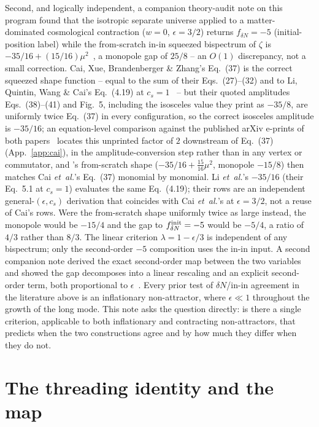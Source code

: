 \documentclass[aps,prd,twocolumn,superscriptaddress,showpacs,preprintnumbers,nofootinbib,longbibliography,floatfix]{revtex4-2}
\newcommand{\eps}{\epsilon}
\newcommand{\etal}{\textit{et~al.}}
\begin{document}
Second, and logically independent, a companion theory-audit note on this program found
that the isotropic separate universe applied to a matter-dominated cosmological
contraction ($w=0$, $\eps=3/2$) returns $f_{\delta N}=-5$ (initial-position label) while
the from-scratch in-in squeezed bispectrum of $\zeta$ is
$-35/16+(15/16)\mu^2$~\cite{Golden2026Monopole}, a monopole gap of $25/8$ -- an $O(1)$
discrepancy, not a small correction. Cai, Xue, Brandenberger \& Zhang's Eq.~(37) is the correct squeezed shape function --
equal to the sum of their Eqs.~(27)--(32) and to Li, Quintin, Wang \& Cai's Eq.~(4.19) at
$c_s=1$~\cite{Cai2009,LiQuintinWangCai2017} -- but their quoted amplitudes Eqs.~(38)--(41)
and Fig.~5, including the isosceles value they print as $-35/8$, are uniformly twice
Eq.~(37) in every configuration, so the correct isosceles amplitude is $-35/16$; an
equation-level comparison against the published arXiv e-prints of both
papers~\cite{Golden2026CaiFactor} locates this unprinted factor of $2$ downstream of
Eq.~(37) (App.~\ref{app:cai}), in the amplitude-conversion
step rather than in any vertex or commutator, and \cite{Golden2026Monopole}'s from-scratch shape
($-35/16+\tfrac{15}{16}\mu^2$, monopole $-15/8$) then matches Cai \etal's Eq.~(37) monomial by
monomial. Li \etal's $-35/16$ (their Eq.~5.1 at $c_s=1$) evaluates the same Eq.~(4.19); their
rows are an independent general-$(\eps,c_s)$ derivation that coincides with Cai \etal's at
$\eps=3/2$, not a reuse of Cai's rows. Were the from-scratch shape
uniformly twice as large instead, the monopole would be $-15/4$ and the gap to
$f_{\delta N}^{\rm init}=-5$ would be $-5/4$, a ratio of $4/3$ rather than $8/3$. The
linear criterion $\lambda=1-\eps/3$ is independent of any bispectrum; only the
second-order $-5$ composition uses the in-in input. A second companion
note derived the exact
second-order map between the two variables and showed the gap decomposes into a linear
rescaling and an explicit second-order term, both proportional to
$\eps$~\cite{Golden2026Threading}. Every prior test of $\delta N$/in-in agreement in the
literature above is an inflationary non-attractor, where $\eps\ll1$ throughout the growth
of the long mode. This note asks the question directly: is there a single criterion,
applicable to both inflationary and contracting non-attractors, that predicts when the
two constructions agree and by how much they differ when they do not.

\section{The threading identity and the map}
\end{document}
